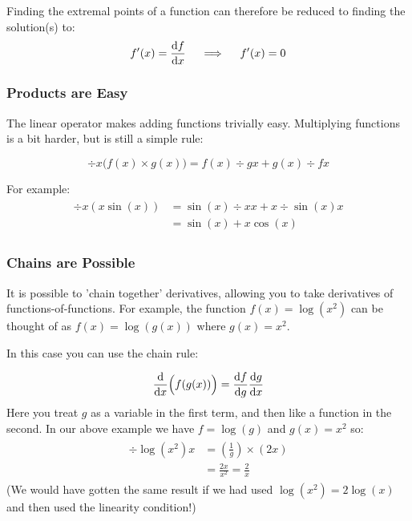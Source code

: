 \documentclass[a4paper,openany,11pt]{book}
\begin{document}
						Finding the extremal points of a function can therefore be reduced to finding the solution(s) to:
						\begin{equation}
							f^\prime(x) = \frac{\mathrm d f}{\mathrm d x} ~~~~\Longrightarrow ~~~~f^\prime(x) = 0
						\end{equation}

					\subsubsection{Products are Easy}

						The linear operator makes adding functions trivially easy. Multiplying functions is a bit harder, but is still a simple rule:

						\begin{equation}
							\div{}{x}\Big( f(x) \times g(x) \Big) = f(x) \div{g}{x} + g(x) \div{f}{x}
						\end{equation}

						For example:
						\begin{align}
							\begin{split}
							\div{}{x}( x \sin(x)) & = \sin(x) \div{x}{x}  + x \div{\sin(x)}{x}
							\\
							& = \sin(x) + x \cos(x)
							\end{split}
						\end{align}

					\subsubsection{Chains are Possible}

						It is possible to 'chain together' derivatives, allowing you to take derivatives of functions-of-functions. For example, the function $f(x) = \log(x^2)$ can be thought of as $f(x) = \log(g(x))$ where $g(x) = x^2$.

						In this case you can use the chain rule:

						\begin{equation}
							\frac{\mathrm d }{\mathrm d x} \Big( f(g(x)) \Big) = \frac{\mathrm d f}{\mathrm d g} \frac{\mathrm d g}{\mathrm d x}
						\end{equation}
						Here you treat $g$ as a variable in the first term, and then like a function in the second. In our above example we have $f = \log(g)$ and $g(x) = x^2$ so:
						\begin{align}
							\begin{split}
							\div{\log(x^2)}{x} & = \left(\frac{1}{g} \right) \times \left( 2 x \right)
							\\
							& = \frac{2x}{x^2} = \frac{2}{x}
						\end{split}
					\end{align}
					(We would have gotten the same result if we had used $\log(x^2) = 2 \log(x)$ and then used the linearity condition!)
\end{document}
